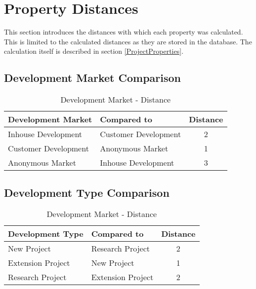 \chapter{Property Distances}
\label{app:propdist}

This section introduces the distances with which each property was calculated. This is limited to the calculated distances as they are stored in the database. The calculation itself is described in section \ref{ProjectProperties}.
\section{Development Market Comparison}
\begin{table}[h]
	\centering 
	\setlength{\tabcolsep}{4pt}
	\begin{tabular}{|l|l|c|}\hline
		Development Market		& Compared to 			&  Distance 	\\ \hline
		Inhouse Development   	& Customer Development	& 2      		\\ \hline
		Customer Development   	& Anonymous Market 		& 1      		\\ \hline
		Anonymous Market   		& Inhouse Development 	& 3     		\\ \hline
	\end{tabular} 
	\caption{Development Market - Distance} 
	\label{developmentmarketcomparison} 
\end{table}
\section{Development Type Comparison}
\begin{table}[h]
	\centering 
	\setlength{\tabcolsep}{4pt}
	\begin{tabular}{|l|l|c|}\hline
		Development Type		& Compared to 			&  Distance 	\\ \hline
		New Project   			& Research Project		& 2      		\\ \hline
		Extension Project   	& New Project 			& 1      		\\ \hline
		Research Project   		& Extension Project 	& 2     		\\ \hline
	\end{tabular} 
	\caption{Development Market - Distance} 
	\label{developmenttypecomparison} 
\end{table}\newpage
